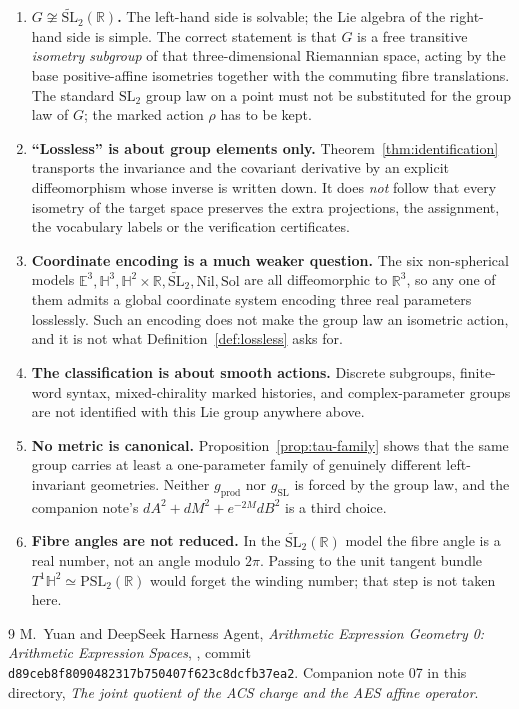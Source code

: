 \documentclass[11pt]{article}
\begin{document}
\begin{enumerate}
\item \textbf{$G\not\cong\widetilde{\mathrm{SL}}_2(\mathbb R)$.} The left-hand
side is solvable; the Lie algebra of the right-hand side is simple. The correct
statement is that $G$ is a free transitive \emph{isometry subgroup} of that
three-dimensional Riemannian space, acting by the base positive-affine isometries
together with the commuting fibre translations. The standard $\mathrm{SL}_2$
group law on a point must not be substituted for the group law of $G$; the marked
action $\rho$ has to be kept.
\item \textbf{``Lossless'' is about group elements only.} Theorem~\ref{thm:identification}
transports the invariance and the covariant derivative by an explicit
diffeomorphism whose inverse is written down. It does \emph{not} follow that
every isometry of the target space preserves the extra projections, the
assignment, the vocabulary labels or the verification certificates.
\item \textbf{Coordinate encoding is a much weaker question.} The six
non-spherical models $\mathbb E^3,\mathbb H^3,\mathbb H^2\times\mathbb R,
\widetilde{\mathrm{SL}}_2,\mathrm{Nil},\mathrm{Sol}$ are all diffeomorphic to
$\mathbb R^3$, so any one of them admits a global coordinate system encoding three
real parameters losslessly. Such an encoding does not make the group law an
isometric action, and it is not what Definition~\ref{def:lossless} asks for.
\item \textbf{The classification is about smooth actions.} Discrete subgroups,
finite-word syntax, mixed-chirality marked histories, and complex-parameter
groups are not identified with this Lie group anywhere above.
\item \textbf{No metric is canonical.} Proposition~\ref{prop:tau-family} shows
that the same group carries at least a one-parameter family of genuinely
different left-invariant geometries. Neither $g_{\mathrm{prod}}$ nor
$g_{\mathrm{SL}}$ is forced by the group law, and the companion note's
$dA^2+dM^2+e^{-2M}dB^2$ is a third choice.
\item \textbf{Fibre angles are not reduced.} In the
$\widetilde{\mathrm{SL}}_2(\mathbb R)$ model the fibre angle is a real number, not
an angle modulo $2\pi$. Passing to the unit tangent bundle
$T^1\mathbb H^2\simeq\mathrm{PSL}_2(\mathbb R)$ would forget the winding number;
that step is not taken here.
\end{enumerate}

\begin{thebibliography}{9}
M.~Yuan and DeepSeek Harness Agent,
\emph{Arithmetic Expression Geometry 0: Arithmetic Expression Spaces},
, commit \texttt{d89ceb8f8090482317b750407f623c8dcfb37ea2}.
Companion note 07 in this directory,
\emph{The joint quotient of the ACS charge and the AES affine operator}.
\end{thebibliography}
\end{document}
